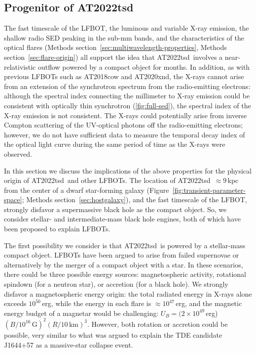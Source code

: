 \documentclass{nature_plusfigure}
\newcommand{\at}{AT2022tsd}
\begin{document}
\begin{methods}
\section{Progenitor of \at}
\label{sec:at2022tsd-origin}

The fast timescale of the LFBOT, the luminous and variable X-ray emission, the shallow radio SED peaking in the sub-mm bands, and the characteristics of the optical flares (Methods section~\ref{sec:multiwavelength-properties}, Methods section~\ref{sec:flare-origin}) all support the idea that \at\ involves a near-relativistic outflow powered by a compact object for months.
In addition, as with previous LFBOTs such as AT2018cow and AT2020xnd, the X-rays cannot arise from an extension of the synchrotron spectrum from the radio-emitting electrons\cite{Margutti2019,Ho2019,Ho2022_AT2020xnd}: although the spectral index connecting the millimeter to X-ray emission could be consistent with optically thin synchrotron (\ref{fig:full-sed}), the spectral index of the X-ray emission is not consistent.
The X-rays could potentially arise from inverse Compton scattering of the UV-optical photons off the radio-emitting electrons; however, we do not have sufficient data to measure the temporal decay index of the optical light curve during the same period of time as the X-rays were observed.

In this section we discuss the implications of the above properties for the physical origin of \at\ and other LFBOTs. The location of \at\ $\approx9\,$kpc from the center of a dwarf star-forming galaxy (Figure~\ref{fig:transient-parameter-space}; Methods section~\ref{sec:hostgalaxy}), and the fast timescale of the LFBOT, strongly disfavor a supermassive black hole as the compact object. So, we consider stellar- and intermediate-mass black hole engines, both of which have been proposed to explain LFBOTs\cite{Perley2019,Margutti2019,Metzger2022,Chen2023}. 

The first possibility we consider is that \at\ is powered by a stellar-mass compact object. LFBOTs have been argued to arise from failed supernovae\cite{Perley2019,Margutti2019} or alternatively by the merger of a compact object with a star\cite{Metzger2022}. In these scenarios, there could be three possible energy sources: magnetospheric activity, rotational spindown (for a neutron star), or accretion (for a black hole). We strongly disfavor a magnetospheric energy origin: the total radiated energy in X-rays alone exceeds $10^{50}\,$erg, while the energy in each flare is $\approx10^{47}\,$erg, and the magnetic energy budget of a magnetar would be challenging: $U_B = (2\times10^{49}\,$erg)$(B/10^{16}\,\mathrm{G})^2 (R/10\,\mathrm{km})^3$. However, both rotation or accretion could be possible, very similar to what was argued to explain the TDE candidate J1644+57 as a massive-star collapse event\cite{Quataert2012}. 


\end{methods}
\end{document}
